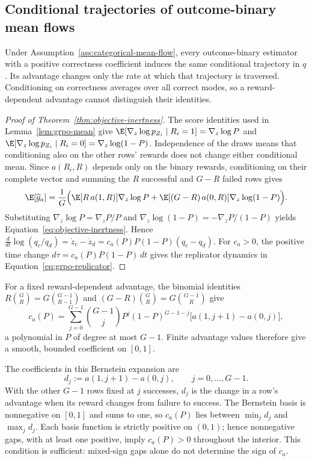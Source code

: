 \subsection{Conditional trajectories of outcome-binary mean flows}
\label{app:theory-objective-inertness}

Under Assumption~\ref{ass:categorical-mean-flow}, every outcome-binary
estimator with a positive correctness coefficient induces the same
conditional trajectory in $q$. Its advantage changes only the rate at which
that trajectory is traversed. Conditioning on correctness averages over all
correct modes, so a reward-dependent advantage cannot distinguish their
identities.

\begin{proof}[Proof of Theorem~\ref{thm:objective-inertness}]
\enforcehalffinalproseline
The score identities used in Lemma~\ref{lem:grpo-mean} give
$\E[\nabla_z\log p_{Z_i}\mid R_i=1]=\nabla_z\log P$ and
$\E[\nabla_z\log p_{Z_i}\mid R_i=0]=\nabla_z\log(1-P)$.
Independence of the draws means that conditioning also on the other rows'
rewards does not change either conditional mean. Since $a(R_i,R)$ depends
only on the binary rewards, conditioning on their complete vector and
summing the $R$ successful and $G-R$ failed rows gives
\[
  \E[\widehat g_a]
  =\frac1G\Big(\E[R\,a(1,R)]\nabla_z\log P
   +\E[(G-R)\,a(0,R)]\nabla_z\log(1-P)\Big).
\]
Substituting $\nabla_z\log P=\nabla_zP/P$ and
$\nabla_z\log(1-P)=-\nabla_zP/(1-P)$ yields
Equation~\eqref{eq:objective-inertness}. Hence
$\frac{d}{dt}\log(q_c/q_d)=\dot z_c-\dot z_d=c_a(P)P(1-P)(q_c-q_d)$.
For $c_a>0$, the positive time change $d\tau=c_a(P)P(1-P)\,dt$ gives
the replicator dynamics in Equation~\eqref{eq:grpo-replicator}.
\end{proof}

For a fixed reward-dependent advantage, the binomial identities
$R\binom GR=G\binom{G-1}{R-1}$ and
$(G-R)\binom GR=G\binom{G-1}{R}$ give
\begin{equation}
 c_a(P)=\sum_{j=0}^{G-1}\binom{G-1}{j}P^j(1-P)^{G-1-j}
 \big[a(1,j+1)-a(0,j)\big],
 \label{eq:inertness-polynomial}
\end{equation}
a polynomial in $P$ of degree at most $G-1$. Finite advantage values
therefore give a smooth, bounded coefficient on $[0,1]$.

The coefficients in this Bernstein expansion are
\begin{equation}
 d_j:=a(1,j+1)-a(0,j),\qquad j=0,\ldots,G-1 .
 \label{eq:leave-one-out-gap}
\end{equation}
With the other $G-1$ rows fixed at $j$ successes, $d_j$ is the change in a
row's advantage when its reward changes from failure to success. The
Bernstein basis is nonnegative on $[0,1]$ and sums to one, so $c_a(P)$ lies
between $\min_jd_j$ and $\max_jd_j$. Each basis function is strictly positive
on $(0,1)$; hence nonnegative gaps, with at least one positive, imply
$c_a(P)>0$ throughout the interior. This condition is sufficient:
mixed-sign gaps alone do not determine the sign of $c_a$.

